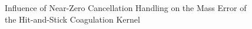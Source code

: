 \newpage


\newpage

\begin{figure}[h!]
    \centering
    \begin{minipage}{.5\linewidth}
        \centering
    \end{minipage}%
    \begin{minipage}{.5\linewidth}
        \centering
    \end{minipage}
    \caption{Influence of Near-Zero Cancellation Handling on the Mass Error of the
        Hit-and-Stick Coagulation Kernel}
    \label{}
\end{figure}

\newpage
